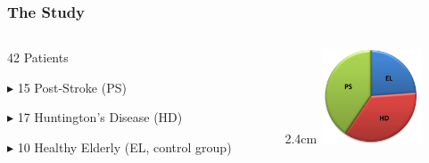 \documentclass[aspectratio=43]{beamer} 	%
\begin{document}
\begin{frame}
\frametitle {The Study}

\begin{columns}
\begin{column}{7.5cm}
\begin{block}
{42 Patients}
\end{block}

\begin{block}
{$\blacktriangleright$ 15 Post-Stroke (PS)}
\end{block}

\begin{block}
{$\blacktriangleright$ 17 Huntington's Disease (HD)}
\end{block}

\begin{block}
{$\blacktriangleright$ 10 Healthy Elderly (EL, control group)}
\end{block}
\end{column}
\begin {column}{2.4cm}
\includegraphics[height=2.8cm]{Study.png}
\begin{block}
{ }
\end{block}


\end{column}
\end{columns}

\end{frame}
\end{document}
